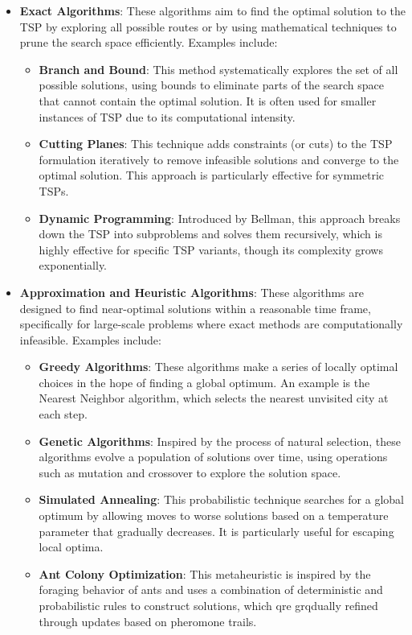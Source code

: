 \begin{itemize}
    \item \textbf{Exact Algorithms}: These algorithms aim to find the optimal solution to the TSP by exploring all possible routes or by using mathematical techniques to prune the search space efficiently. Examples include:
          \begin{itemize}
              \item \textbf{Branch and Bound}: This method systematically explores the set of all possible solutions, using bounds to eliminate parts of the search space that cannot contain the optimal solution. It is often used for smaller instances of TSP due to its computational intensity. \cite{branch_and_bound}
              \item \textbf{Cutting Planes}: This technique adds constraints (or cuts) to the TSP formulation iteratively to remove infeasible solutions and converge to the optimal solution. This approach is particularly effective for symmetric TSPs. \cite{cutting_planes}
              \item \textbf{Dynamic Programming}: Introduced by Bellman, this approach breaks down the TSP into subproblems and solves them recursively, which is highly effective for specific TSP variants, though its complexity grows exponentially. \cite{dynamic_programming_tsp}
          \end{itemize}
    \item \textbf{Approximation and Heuristic Algorithms}: These algorithms are designed to find near-optimal solutions within a reasonable time frame, specifically for large-scale problems where exact methods are computationally infeasible. Examples include:
          \begin{itemize}
              \item \textbf{Greedy Algorithms}: These algorithms make a series of locally optimal choices in the hope of finding a global optimum. An example is the Nearest Neighbor algorithm, which selects the nearest unvisited city at each step. \cite{greedy}
              \item \textbf{Genetic Algorithms}: Inspired by the process of natural selection, these algorithms evolve a population of solutions over time, using operations such as mutation and crossover to explore the solution space. \cite{genetic_algorithm}
              \item \textbf{Simulated Annealing}: This probabilistic technique searches for a global optimum by allowing moves to worse solutions based on a temperature parameter that gradually decreases. It is particularly useful for escaping local optima. \cite{simulated_annealing}
              \item \textbf{Ant Colony Optimization}: This metaheuristic is inspired by the foraging behavior of ants and uses a combination of deterministic and probabilistic rules to construct solutions, which qre grqdually refined through updates based on pheromone trails. \cite{ant_colony}
          \end{itemize}
\end{itemize}

